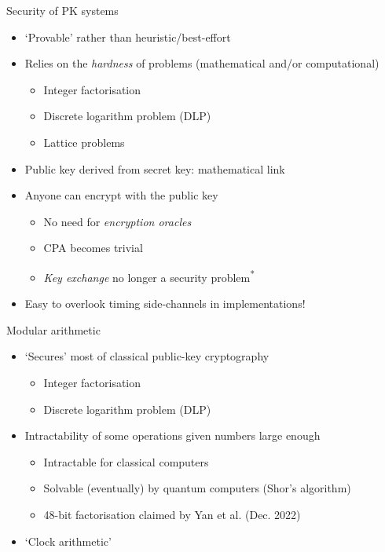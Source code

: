 \begin{frame}{Security of PK systems}
  \begin{itemize}[<+(1)->]
    \item `Provable' rather than heuristic/best-effort
    \item Relies on the \emph{hardness} of problems (mathematical and/or computational)
    \begin{itemize}
      \item Integer factorisation
      \item Discrete logarithm problem (DLP)
      \item Lattice problems
    \end{itemize}
    \item Public key derived from secret key: mathematical link
    \item Anyone can encrypt with the public key
    \begin{itemize}
      \item No need for \emph{encryption oracles}
      \item CPA becomes trivial
      \item \emph{Key exchange} no longer a security problem\textsuperscript{*}
    \end{itemize}
    \item Easy to overlook timing side-channels in implementations!
  \end{itemize}
\end{frame}

\begin{frame}{Modular arithmetic}
  \begin{itemize}[<+->]
    \item `Secures' most of classical public-key cryptography
    \begin{itemize}
      \item Integer factorisation
      \item Discrete logarithm problem (DLP)
    \end{itemize}
    \item Intractability of some operations given numbers large enough
    \begin{itemize}
      \item Intractable for classical computers
      \item Solvable (eventually) by quantum computers (Shor's algorithm)
      \item 48-bit factorisation claimed by Yan et al. (Dec. 2022)
    \end{itemize}
    \item `Clock arithmetic'
  \end{itemize}
\end{frame}

